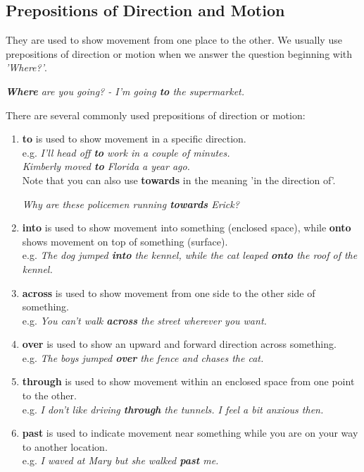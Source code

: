 \documentclass[hidelinks,10pt,a4paper]{article}
\begin{document}
\subsection{Prepositions of Direction and Motion}
They are used to show movement from one place to the other. We usually use prepositions of direction or motion when we answer the question beginning with \textit{'Where?'}.

\begin{center}
	\textit{\textbf{Where} are you going? - I'm going \textbf{to} the supermarket.}
\end{center}

There are several commonly used prepositions of direction or motion:
\begin{enumerate}[label=(\alph*)]
	\item \textbf{to} is used to show movement in a specific direction. \\
		e.g. \textit{I'll head off \textbf{to} work in a couple of minutes.\\
		Kimberly moved \textbf{to} Florida a year ago.} \\

		Note that you can also use \textbf{towards} in the meaning 'in the direction of'.
		\begin{center}
			\textit{Why are these policemen running \textbf{towards} Erick? }
		\end{center}
	\item \textbf{into} is used to show movement into something (enclosed space), while \textbf{onto} shows movement on top of something (surface). \\
		e.g. \textit{The dog jumped \textbf{into} the kennel, while the cat leaped \textbf{onto} the roof of the kennel.}
	\item \textbf{across} is used to show movement from one side to the other side of something. \\
		e.g. \textit{You can't walk \textbf{across} the street wherever you want.}
	\item \textbf{over} is used to show an upward and forward direction across something. \\
		e.g. \textit{The boys jumped \textbf{over} the fence and chases the cat.}
	\item \textbf{through} is used to show movement within an enclosed space from one point to the other. \\
		e.g. \textit{I don't like driving \textbf{through} the tunnels. I feel a bit anxious then.}
	\item \textbf{past} is used to indicate movement near something while you are on your way to another location. \\
		e.g. \textit{I waved at Mary but she walked \textbf{past} me.}
\end{enumerate}
\end{document}
